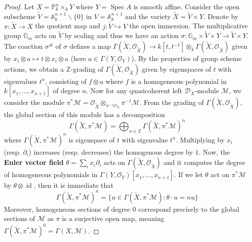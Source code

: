 \documentclass[11pt, a4paper]{article}
\theoremstyle{definition}
\newcommand{\s}[0]{\sigma}
\newcommand{\Z}[0]{\mathbb{Z}}
\newcommand{\A}[0]{\mathbb{A}}
\newcommand{\Spec}[0]{\operatorname{Spec}}
\newcommand{\id}[0]{\operatorname{id}}
\begin{document}
    \begin{proof}
        Let $X=\mathbb P^n_k\times_k Y$ where $Y=\Spec A$ is smooth affine. Consider the open subscheme $\widetilde V=\A^{n+1}_k\backslash \{0\}$ in $V=\A^{n+1}_k$ and the variety $\widetilde X=\widetilde V\times Y$. Denote by $\pi:\widetilde X\to X$ the quotient map and $j:\widetilde{V}\hookrightarrow V$ the open immersion. The multiplicative group $\mathbb G_m$ acts on $\widetilde V$ by scaling and thus we have an action $\s:\mathbb G_m\times \widetilde V\times Y\to \widetilde V\times Y$. The coaction $\s^\#$ of $\s$ defines a map $\Gamma(\widetilde{X}, \mathcal O_{\widetilde{X}})\to k[t, t^{-1}]\otimes_k \Gamma(\widetilde{X}, \mathcal O_{\widetilde{X}})$ given by $x_i\otimes a\mapsto t\otimes x_i\otimes a$ (here $a\in \Gamma(Y, \mathcal O_Y)$). By the properties of group scheme actions, we obtain a $\Z$-grading of $\Gamma(\widetilde{X}, \mathcal O_{\widetilde{X}})$ given by eigenspaces of $t$ with eigenvalues $t^n$, consisting of $f\otimes a$ where $f$ is a homogeneous polynomial in $k[x_1,\dots, x_{n+1}]$ of degree $n$. Now for any quasicoherent left $\mathcal D_X$-module $\mathcal M$, we consider the module $\pi^*\mathcal M=\mathcal O_{\widetilde{X}}\otimes_{\pi^{-1}\mathcal O_X}\pi^{-1}\mathcal M$. From the grading of $\Gamma(\widetilde{X}, \mathcal O_{\widetilde{X}})$, the global section of this module has a decomposition
        \[\Gamma(\widetilde{X}, \pi^*\mathcal M)=\bigoplus_{n\in\Z}\Gamma(\widetilde{X}, \pi^*\mathcal M)^n\]
        where $\Gamma(\widetilde{X}, \pi^*\mathcal M)^n$ is eigenspace of $t$ with eigenvalue $t^n$. Multiplying by $x_i$ (resp. $\partial_i$) increases (resp. decreases) the homogenous degree by $1$. Now, the \textbf{Euler vector field} $\theta=\sum_i x_i\partial_i$ acts on $\Gamma(\widetilde{X}, \mathcal O_{\widetilde{X}})$ and it computes the degree of homogeneous polynomials in $\Gamma(Y, \mathcal O_Y)[x_1,\dots, x_{n+1}]$. If we let $\theta$ act on $\pi^*\mathcal M$ by $\theta\otimes\id$, then it is immediate that
        \[\Gamma(\widetilde{X}, \pi^*\mathcal M)^n=\{u\in\Gamma(\widetilde{X}, \pi^*\mathcal M) :\theta \cdot u=nu\}\]
        Moreover, homogeneous sections of degree $0$ correspond precisely to the global sections of $\mathcal M$ as $\pi$ is a surjective open map, meaning $\Gamma(\widetilde{X}, \pi^*\mathcal M)^0=\Gamma(X, \mathcal M)$.


\end{proof}
\end{document}
